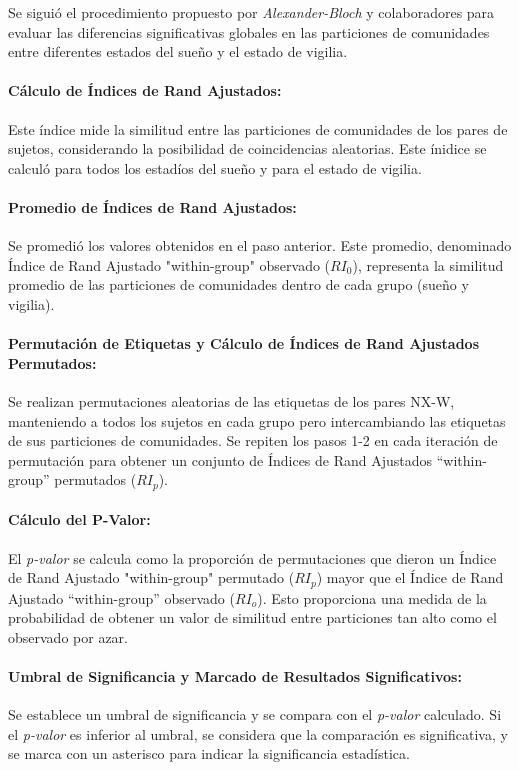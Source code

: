 \documentclass{article}
\begin{document}
Se siguió el procedimiento propuesto por \textit{Alexander-Bloch} \cite{Alexander-Bloch:2012aa} y colaboradores para evaluar las diferencias significativas globales en las particiones de comunidades entre diferentes estados del sueño y el estado de vigilia.

\paragraph{Cálculo de Índices de Rand Ajustados:} Este índice mide la similitud entre las particiones de comunidades de los pares de sujetos, considerando la posibilidad de coincidencias aleatorias. Este ínidice se calculó para todos los estadíos del sueño y para el estado de vigilia.

\paragraph{Promedio de Índices de Rand Ajustados:} Se promedió los valores obtenidos en el paso anterior. Este promedio, denominado Índice de Rand Ajustado "within-group" observado ($RI_0$), representa la similitud promedio de las particiones de comunidades dentro de cada grupo (sueño y vigilia).

\paragraph{Permutación de Etiquetas y Cálculo de Índices de Rand Ajustados Permutados:} Se realizan permutaciones aleatorias de las etiquetas de los pares NX-W, manteniendo a todos los sujetos en cada grupo pero intercambiando las etiquetas de sus particiones de comunidades. Se repiten los pasos 1-2 en cada iteración de permutación para obtener un conjunto de Índices de Rand Ajustados ``within-group'' permutados ($RI_p$).

\paragraph{Cálculo del P-Valor:} El \textit{p-valor} se calcula como la proporción de permutaciones que dieron un Índice de Rand Ajustado "within-group" permutado ($RI_p$) mayor que el Índice de Rand Ajustado ``within-group'' observado ($RI_o$). Esto proporciona una medida de la probabilidad de obtener un valor de similitud entre particiones tan alto como el observado por azar.

\paragraph{Umbral de Significancia y Marcado de Resultados Significativos:} Se establece un umbral de significancia y se compara con el \textit{p-valor} calculado. Si el \textit{p-valor} es inferior al umbral, se considera que la comparación es significativa, y se marca con un asterisco para indicar la significancia estadística.
\end{document}
